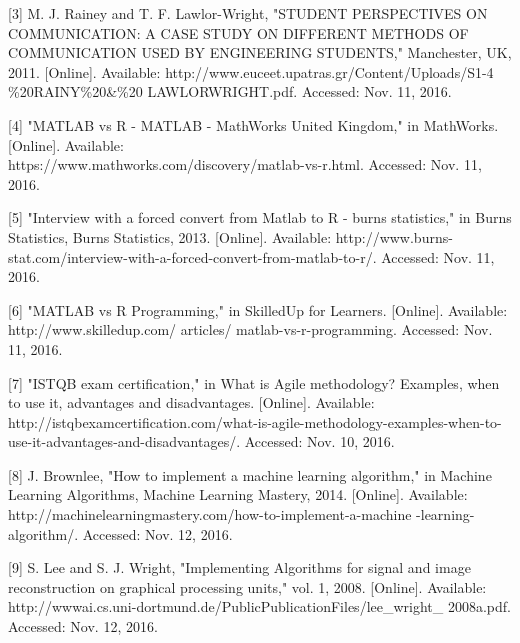 \documentclass[a4,draftclsnofoot,onecolumn,margin=0.75,10pt]{IEEEtran}
\begin{document}
[3]	M. J. Rainey and T. F. Lawlor-Wright, "STUDENT PERSPECTIVES ON COMMUNICATION: A CASE STUDY ON DIFFERENT METHODS OF COMMUNICATION USED BY ENGINEERING STUDENTS," Manchester, UK, 2011. [Online]. Available: http://www.euceet.upatras.gr/Content/Uploads/S1-4 \%20RAINY\%20\&\%20 LAWLOR\-WRIGHT.pdf. Accessed: Nov. 11, 2016.
\par\null\par

[4]	"MATLAB vs R - MATLAB - MathWorks United Kingdom," in MathWorks. [Online]. Available:\\ https://www.mathworks.com/discovery/matlab-vs-r.html. Accessed: Nov. 11, 2016.
\par\null\par

[5]	"Interview with a forced convert from Matlab to R - burns statistics," in Burns Statistics, Burns Statistics, 2013. [Online]. Available: http://www.burns-stat.com/interview-with-a-forced-convert-from-matlab-to-r/. Accessed: Nov. 11, 2016.
\par\null\par

[6]	"MATLAB vs R Programming," in SkilledUp for Learners. [Online]. Available: http://www.skilledup.com/ articles/
matlab-vs-r-programming. Accessed: Nov. 11, 2016.
\par\null\par

[7]	"ISTQB exam certification," in What is Agile methodology? Examples, when to use it, advantages and disadvantages. [Online]. Available: http://istqbexamcertification.com/what-is-agile-methodology-examples-when-to-use-it-advantages-and-disadvantages/. Accessed: Nov. 10, 2016.
\par\null\par

[8]	J. Brownlee, "How to implement a machine learning algorithm," in Machine Learning Algorithms, Machine Learning Mastery, 2014. [Online]. Available: http://machinelearningmastery.com/how-to-implement-a-machine -learning-algorithm/. Accessed: Nov. 12, 2016.
\par\null\par

[9]	S. Lee and S. J. Wright, "Implementing Algorithms for signal and image reconstruction on graphical processing units," vol. 1, 2008. [Online]. Available: http://www\-ai.cs.uni-dortmund.de/PublicPublicationFiles/lee\_wright\_ 2008a.pdf. Accessed: Nov. 12, 2016.

\fi
\end{document}
